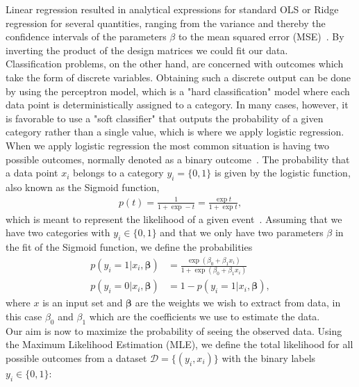 \documentclass[english,notitlepage,reprint,nofootinbib]{revtex4-2}  %
\begin{document}
Linear regression resulted in analytical expressions for standard OLS or Ridge regression for several quantities, ranging from the variance and thereby the confidence intervals of the parameters $\beta$ to the mean squared error (MSE)~\cite{lecture_notes}. By inverting the product of the design matrices we could fit our data. 
\vspace{3mm}
\\
Classification problems, on the other hand, are concerned with outcomes which take the form of discrete variables. 
Obtaining such a discrete output can be done by using the perceptron model, which is a "hard classification" model where each data point is deterministically assigned to a category. In many cases, however, it is favorable to use a "soft classifier" that outputs the probability of a given category rather than a single value, which is where we apply logistic regression. 
\vspace{3mm}
\\
When we apply logistic regression the most common situation is having two possible outcomes, normally denoted as a binary outcome~\cite{lecture_notes}. 
The probability that a data point $x_i$ belongs to a category $y_i = \{0,1\}$ is given by the logistic function, also known as the Sigmoid function, 
\begin{align}\label{eq: logistic_function} %
    p(t) = \frac{1}{1+\exp -t} = \frac{\exp t}{1+\exp t}, 
\end{align}
which is meant to represent the likelihood of a given event~\cite{lecture_notes}. 
Assuming that we have two categories with $y_i\in\{0,1\}$ and that we only have two parameters $\beta$ in the fit of the Sigmoid function, we define the probabilities 
\begin{align}
    p(y_i=1 | x_i,\boldsymbol{\beta}) &= 
    \frac{\exp(\beta_0 + \beta_1 x_i)}
    {1 + \exp(\beta_0 + \beta_1 x_i)} \\ 
    p(y_i=0 | x_i,\boldsymbol{\beta}) &= 
    1 - p(y_i=1 | x_i,\boldsymbol{\beta}) , 
\end{align}
where $x$ is an input set and $\boldsymbol{\beta}$ are the weights we wish to extract from data, in this case $\beta_0$ and $\beta_1$ which are the coefficients we use to estimate the data. 
\vspace{3mm}
\\ 
Our aim is now to maximize the probability of seeing the observed data. 
Using the Maximum Likelihood Estimation (MLE), we define the total likelihood for all possible outcomes from a dataset $\mathcal{D} = \{(y_i,x_i)\}$ with the binary labels $y_i\in\{0,1\}$: 
\end{document}
